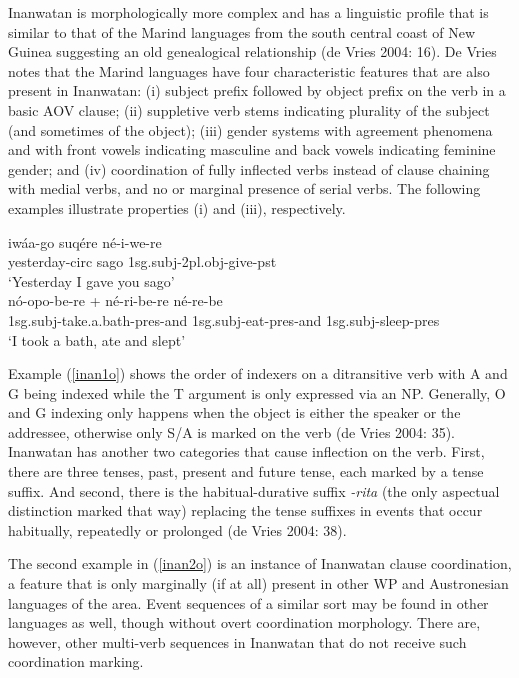 Inanwatan is morphologically more complex and has a linguistic profile that is similar to that of the Marind languages from the south central coast of New Guinea suggesting an old genealogical relationship (de Vries  2004: 16). De Vries notes that the Marind languages have four characteristic features that are also present in Inanwatan: (i) subject prefix followed by object prefix on the verb in a basic AOV clause; (ii) suppletive verb stems indicating plurality of the subject (and sometimes of the object); (iii) gender systems with agreement phenomena and with front vowels indicating masculine and back vowels indicating feminine gender; and (iv) coordination of fully inflected verbs instead of clause chaining with medial verbs, and no or marginal presence of serial verbs. The following examples illustrate properties (i) and (iii), respectively.

\pex 
\a \label{inan1o}
\gll iwáa-go suqére né-i-we-re \\
yesterday-\acs{circ} sago \acs{1}\acs{sg}.\acs{subj}-\acs{2}\acs{pl}.\acs{obj}-give-\acs{pst} \\
\glft `Yesterday I gave you sago' \\ 
\endgl
\a \label{inan2o}
\gla nó-opo-be-re + né-ri-be-re né-re-be \\ 
\acs{1}\acs{sg}.\acs{subj}-take.a.bath-\acs{pres}-and \acs{1}\acs{sg}.\acs{subj}-eat-\acs{pres}-and \acs{1}\acs{sg}.\acs{subj}-sleep-\acs{pres} \\
\glft `I took a bath, ate and slept' \\ 
\endgl
\xe

Example (\ref{inan1o}) shows the order of indexers on a ditransitive verb with A and G being indexed while the T argument is only expressed via an NP. Generally, O and G indexing only happens when the object is either the speaker or the addressee, otherwise only S/A is marked on the verb (de Vries 2004: 35). Inanwatan has another two categories that cause inflection on the verb. First, there are three tenses, past, present and future tense, each marked by a tense suffix. And second, there is the habitual-durative suffix \textit{-rita} (the only aspectual distinction marked that way) replacing the tense suffixes in events that occur habitually, repeatedly or prolonged (de Vries 2004: 38).

The second example in (\ref{inan2o}) is an instance of Inanwatan clause coordination, a feature that is only marginally (if at all) present in other WP and Austronesian languages of the area. Event sequences of a similar sort may be found in other languages as well, though without overt coordination morphology. There are, however, other multi-verb sequences in Inanwatan that do not receive such coordination marking.

